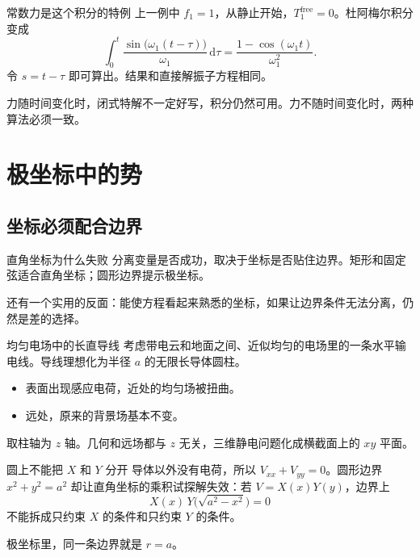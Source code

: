 \documentclass[fontset=windows, chinese, 10pt, xcolor=dvipsnames]{beamer}
\begin{document}
\begin{frame}{常数力是这个积分的特例}
  上一例中 $f_1=1$，从静止开始，$T_1^{\mathrm{free}}=0$。杜阿梅尔积分变成
  \begin{equation*}
    \int_0^{t}\frac{\sin\bigl(\omega_1(t-\tau)\bigr)}{\omega_1}\,\mathrm{d}\tau
    =\frac{1-\cos(\omega_1 t)}{\omega_1^2}.
  \end{equation*}
  令 $s=t-\tau$ 即可算出。结果和直接解振子方程相同。
  \vspace{0.3em}

  力随时间变化时，闭式特解不一定好写，积分仍然可用。力不随时间变化时，两种算法必须一致。
\end{frame}

\section{极坐标中的势}

\subsection{坐标必须配合边界}

\begin{frame}{直角坐标为什么失败}
  分离变量是否成功，取决于坐标是否贴住边界。矩形和固定弦适合直角坐标；圆形边界提示极坐标。
  \vspace{0.4em}

  还有一个实用的反面：能使方程看起来熟悉的坐标，如果让边界条件无法分离，仍然是差的选择。
\end{frame}

\begin{frame}{均匀电场中的长直导线}
  考虑带电云和地面之间、近似均匀的电场里的一条水平输电线。导线理想化为半径 $a$ 的无限长导体圆柱。
  \begin{itemize}
    \item 表面出现感应电荷，近处的均匀场被扭曲。
    \item 远处，原来的背景场基本不变。
  \end{itemize}
  取柱轴为 $z$ 轴。几何和远场都与 $z$ 无关，三维静电问题化成横截面上的 $xy$ 平面。
\end{frame}

\begin{frame}{圆上不能把 $X$ 和 $Y$ 分开}
  导体以外没有电荷，所以 $V_{xx}+V_{yy}=0$。圆形边界 $x^2+y^2=a^2$ 却让直角坐标的乘积试探解失效：若 $V=X(x)Y(y)$，边界上
  \begin{equation*}
    X(x)\,Y\bigl(\sqrt{a^2-x^2}\bigr)=0
  \end{equation*}
  不能拆成只约束 $X$ 的条件和只约束 $Y$ 的条件。
  \vspace{0.4em}

  极坐标里，同一条边界就是 $r=a$。
\end{frame}
\end{document}
